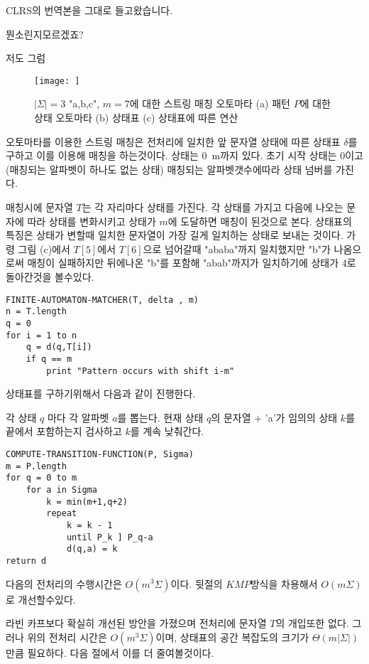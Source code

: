 CLRS의 번역본을 그대로 들고왔습니다.


뭔소린지모르겠죠?

저도 그럼

\newpage



\begin{figure}[h!]
    \centering
    \texttt{[image: ]}
    \caption{$|\Sigma|  = 3$ "a,b,c", $m = 7$에 대한 스트링 매칭 오토마타
    (a) 패턴 $P$에 대한 상태 오토마타 (b) 상태표 (c) 상태표에 따른 연산}
\end{figure}

오토마타를 이용한 스트링 매칭은 전처리에 일치한 앞 문자열 상태에 따른 상태표 $\delta$를 구하고 이를 이용해 매칭을 하는것이다.
상태는 0~m까지 있다. 초기 시작 상태는 0이고(매칭되는 알파벳이 하나도 없는 상태)
매칭되는 알파벳갯수에따라 상태 넘버를 가진다.

매칭시에 문자열 $T$는 각 자리마다 상태를 가진다. 각 상태를 가지고 다음에 나오는 문자에 따라 상태를 변화시키고 상태가 $m$에 도달하면 매칭이 된것으로 본다.
상태표의 특징은 상태가 변할때 일치한 문자열이 가장 길게 일치하는 상태로 보내는 것이다.
가령 그림 (c)에서 $T[5]$에서 $T[6]$으로 넘어갈때 "ababa"까지 일치했지만 "b"가 나옴으로써 매칭이 실패하지만 뒤에나온 "b"를 포함해 "abab"까지가 일치하기에 상태가 4로 돌아간것을 볼수있다.

\begin{lstlisting}[syle = CStyle]
FINITE-AUTOMATON-MATCHER(T, delta , m)
n = T.length
q = 0 
for i = 1 to n
    q = d(q,T[i])
    if q == m
        print "Pattern occurs with shift i-m"
\end{lstlisting}


상태표를 구하기위해서 다음과 같이 진행한다.

각 상태 $q$ 마다 각 알파벳 $a$를 뽑는다.
현재 상태 $q$의 문자열 + 'a'가 임의의 상태 $k$를 끝에서 포함하는지 검사하고 $k$를 계속 낮춰간다.

\begin{lstlisting}[syle = CStyle]
COMPUTE-TRANSITION-FUNCTION(P, Sigma)
m = P.length
for q = 0 to m
    for a in Sigma
        k = min(m+1,q+2)
        repeat 
            k = k - 1
            until P_k ] P_q-a
            d(q,a) = k
return d
\end{lstlisting}



다음의 전처리의 수행시간은  $O(m^3 \Sigma)$이다.
뒷절의 $KMP$방식을 차용해서 $O(m \Sigma)$로 개선할수있다.


라빈 카프보다 확실히 개선된 방안을 가졌으며 전처리에 문자열 $T$의 개입또한 없다. 그러나 위의 전처리 시간은 $O(m^3 \Sigma)$이며, 상태표의 공간 복잡도의 크기가 $\Theta(m|\Sigma|)$만큼 필요하다.
다음 절에서 이를 더 줄여볼것이다.






